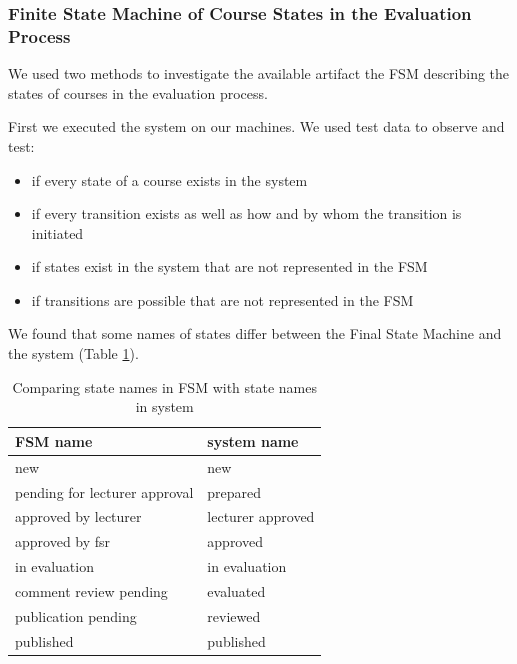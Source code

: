 \subsubsection{Finite State Machine of Course States in the Evaluation Process}
We used two methods to investigate the available artifact the FSM describing the states of courses in the evaluation process.

First we executed the system on our machines.
We used test data to observe and test:
\begin{itemize}
    \item if every state of a course exists in the system
    \item if every transition exists as well as how and by whom the transition is initiated
    \item if states exist in the system that are not represented in the FSM
    \item if transitions are possible that are not represented in the FSM
\end{itemize} 

We found that some names of states differ between the Final State Machine and the system (Table \ref{tab:state-names}).
\begin{table}[]
    \centering
    \label{tab:state-names}
    \begin{tabular}{|l|l|}
        \hline
        FSM name                      & system name       \\ \hline \hline
        new                           & new               \\ \hline
        pending for lecturer approval & prepared          \\ \hline
        approved by lecturer          & lecturer approved \\ \hline
        approved by fsr               & approved          \\ \hline
        in evaluation                 & in evaluation     \\ \hline
        comment review pending        & evaluated         \\ \hline
        publication pending           & reviewed          \\ \hline
        published                     & published         \\ \hline
    \end{tabular}
    \caption{Comparing state names in FSM with state names in system}
\end{table}

